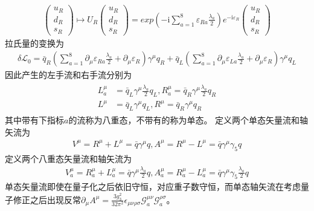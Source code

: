 \documentclass[aps,tightenlines,16pt]{ctexart}
\numberwithin{equation}{section}
\newcommand{\mL}{\mathcal{L}}
\begin{document}
\begin{align}
   \begin{pmatrix}
      u_R\\
      d_R\\
      s_R
   \end{pmatrix}
   \mapsto U_R
   \begin{pmatrix}
      u_R\\
      d_R\\
      s_R
   \end{pmatrix}
   =
   exp\left(-\mbox{i}\sum_{a=1}^{8}\varepsilon_{Ra}\frac{\lambda_a}{2}\right)
   e^{-\mbox{i}\varepsilon_R}
   \begin{pmatrix}
      u_R\\
      d_R\\
      s_R
   \end{pmatrix}
\end{align}
拉氏量的变换为
\begin{align}
   \delta \mL_0 = \bar{q}_R \left(\sum_{a=1}^8\partial_{\mu}\varepsilon_{Ra}\frac{\lambda_a}{2}+\partial_{\mu}\varepsilon_R\right)\gamma^{\mu} q_R + \bar{q}_L \left(\sum_{a=1}^8\partial_{\mu}\varepsilon_{La}\frac{\lambda_a}{2}+\partial_{\mu}\varepsilon_R\right)\gamma^{\mu} q_L
\end{align}
因此产生的左手流和右手流分别为
\begin{align}\label{curr}
   \begin{aligned}
      L^{\mu}_a &= \bar{q}_L\gamma^{\mu}\frac{\lambda_a}{2}q_L, R^{\mu}_a = \bar{q}_R\gamma^{\mu}\frac{\lambda_a}{2}q_R \\
      L^{\mu} &= \bar{q}_L\gamma^{\mu}q_L, R^{\mu} = \bar{q}_R\gamma^{\mu}q_R
   \end{aligned}
\end{align} 
其中带有下指标$a$的流称为八重态，不带有的称为单态。
定义两个单态矢量流和轴矢流为
\begin{align}
   V^{\mu} = R^{\mu} + L^{\mu} = \bar{q}\gamma^{\mu}q, 
   A^{\mu} = R^{\mu} - L^{\mu} = \bar{q}\gamma^{\mu}\gamma_5  q 
\end{align}
定义两个八重态矢量流和轴矢流为
\begin{align}
   V_a^{\mu} = R_a^{\mu} + L_a^{\mu} = \bar{q}\gamma^{\mu}\frac{\lambda_a}{2} q, 
   A_a^{\mu} = R_a^{\mu} - L_a^{\mu} = \bar{q}\gamma^{\mu}\gamma_5 \frac{\lambda_a}{2} q 
\end{align}
单态矢量流即使在量子化之后依旧守恒，对应重子数守恒，而单态轴矢流在考虑量子修正之后出现反常$\partial_{\mu}A^{\mu}=\frac{3g_3^2}{32\pi^2}\epsilon_{\mu\nu\rho\sigma}\mathcal{G}_a^{\mu\nu}\mathcal{G}_a^{\rho\sigma}$。
\end{document}
